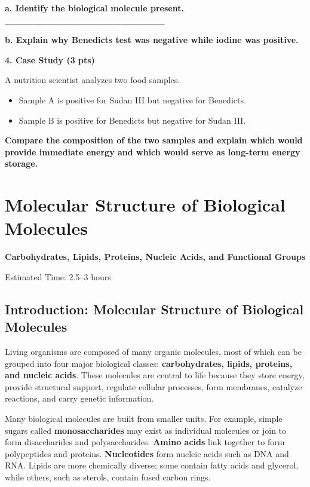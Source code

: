 \documentclass[
  letterpaper,
  DIV=11,
  numbers=noendperiod]{scrreprt}
\begin{document}
\textbf{a. Identify the biological molecule present.
\_\_\_\_\_\_\_\_\_\_\_\_\_\_\_\_\_\_\_\_\_\_}

\textbf{b. Explain why Benedict\textquotesingle s test was negative
while iodine was positive.}

\textbf{4. Case Study (3 pts)}

A nutrition scientist analyzes two food samples.

\begin{itemize}
\item
  Sample A is positive for Sudan III but negative for
  Benedict\textquotesingle s.
\item
  Sample B is positive for Benedict\textquotesingle s but negative for
  Sudan III.
\end{itemize}

\textbf{Compare the composition of the two samples and explain which
would provide immediate energy and which would serve as long-term energy
storage.}


\chapter{\texorpdfstring{\textbf{Molecular Structure of Biological
Molecules}}{Molecular Structure of Biological Molecules}}\label{molecular-structure-of-biological-molecules}

\textbf{Carbohydrates, Lipids, Proteins, Nucleic Acids, and Functional
Groups}

Estimated Time: 2.5--3 hours

\section{\texorpdfstring{\textbf{Introduction: Molecular Structure of
Biological
Molecules}}{Introduction: Molecular Structure of Biological Molecules}}\label{introduction-molecular-structure-of-biological-molecules}

Living organisms are composed of many organic molecules, most of which
can be grouped into four major biological classes:
\textbf{carbohydrates, lipids, proteins, and nucleic acids}. These
molecules are central to life because they store energy, provide
structural support, regulate cellular processes, form membranes,
catalyze reactions, and carry genetic information.

Many biological molecules are built from smaller units. For example,
simple sugars called \textbf{monosaccharides} may exist as individual
molecules or join to form disaccharides and polysaccharides.
\textbf{Amino acids} link together to form polypeptides and proteins.
\textbf{Nucleotides} form nucleic acids such as DNA and RNA. Lipids are
more chemically diverse; some contain fatty acids and glycerol, while
others, such as sterols, contain fused carbon rings.
\end{document}
